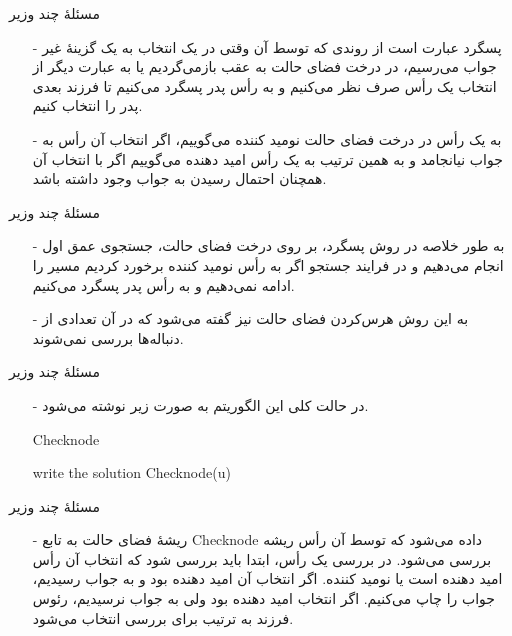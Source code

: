 \begin{frame}{مسئلهٔ چند وزیر}
\begin{itemize}\itemr
\item[-]
پسگرد عبارت است از روندی که توسط آن وقتی در یک انتخاب به یک گزینهٔ غیر جواب می‌رسیم، در درخت فضای حالت به عقب بازمی‌گردیم یا به عبارت دیگر از انتخاب یک رأس صرف نظر می‌کنیم و به رأس پدر پسگرد می‌کنیم تا فرزند بعدی پدر را انتخاب کنیم.
\item[-]
به یک رأس در درخت فضای حالت نومید کننده
می‌گوییم، اگر انتخاب آن رأس به جواب نیانجامد و به همین ترتیب به یک رأس امید دهنده
می‌گوییم اگر با انتخاب آن همچنان احتمال رسیدن به جواب وجود داشته باشد.
\end{itemize}
\end{frame}


\begin{frame}{مسئلهٔ چند وزیر}
\begin{itemize}\itemr
\item[-]
به طور خلاصه در روش پسگرد، بر روی درخت فضای حالت، جستجوی عمق اول انجام می‌دهیم و در فرایند جستجو اگر به رأس نومید کننده برخورد کردیم مسیر را ادامه نمی‌دهیم و به رأس پدر پسگرد می‌کنیم.
\item[-]
به این روش هرس‌کردن
فضای حالت نیز گفته می‌شود که در آن تعدادی از دنباله‌ها بررسی نمی‌شوند.
\end{itemize}
\end{frame}


\begin{frame}{مسئلهٔ چند وزیر}
\begin{itemize}\itemr
\item[-]
در حالت کلی این الگوریتم به صورت زیر نوشته می‌شود.
\begin{algorithm}[H]\alglr
  \caption{Checknode} 
  \begin{algorithmic}[1]
   				\State write the solution
   		\Else
   					\State Checknode(u)
   			\EndFor
   		\EndIf
   	\EndIf                           
  \end{algorithmic}
  \label{alg:merge}
\end{algorithm}
\end{itemize}
\end{frame}


\begin{frame}{مسئلهٔ چند وزیر}
\begin{itemize}\itemr
\item[-]
ریشهٔ فضای حالت به تابع
Checknode
داده می‌شود که توسط آن رأس ریشه بررسی می‌شود. در بررسی یک رأس، ابتدا باید بررسی شود که انتخاب آن رأس امید دهنده است یا نومید کننده. اگر انتخاب آن امید دهنده بود و به جواب رسیدیم،‌ جواب را چاپ می‌کنیم. اگر انتخاب امید دهنده بود ولی به جواب نرسیدیم، رئوس فرزند به ترتیب برای بررسی انتخاب می‌شود.
\end{itemize}
\end{frame}


